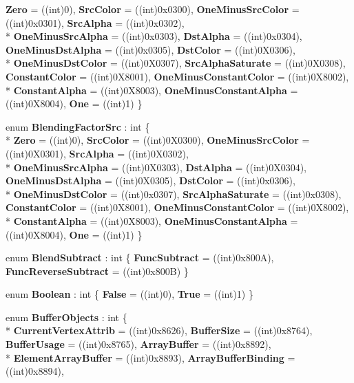\begin{DoxyCompactItemize}
{\bfseries Zero} = ((int)0), 
{\bfseries Src\-Color} = ((int)0x0300), 
{\bfseries One\-Minus\-Src\-Color} = ((int)0x0301), 
{\bfseries Src\-Alpha} = ((int)0x0302), 
\\*
{\bfseries One\-Minus\-Src\-Alpha} = ((int)0x0303), 
{\bfseries Dst\-Alpha} = ((int)0x0304), 
{\bfseries One\-Minus\-Dst\-Alpha} = ((int)0x0305), 
{\bfseries Dst\-Color} = ((int)0\-X0306), 
\\*
{\bfseries One\-Minus\-Dst\-Color} = ((int)0\-X0307), 
{\bfseries Src\-Alpha\-Saturate} = ((int)0\-X0308), 
{\bfseries Constant\-Color} = ((int)0\-X8001), 
{\bfseries One\-Minus\-Constant\-Color} = ((int)0\-X8002), 
\\*
{\bfseries Constant\-Alpha} = ((int)0\-X8003), 
{\bfseries One\-Minus\-Constant\-Alpha} = ((int)0\-X8004), 
{\bfseries One} = ((int)1)
 \}
\item 
enum {\bfseries Blending\-Factor\-Src} \-: int \{ \\*
{\bfseries Zero} = ((int)0), 
{\bfseries Src\-Color} = ((int)0\-X0300), 
{\bfseries One\-Minus\-Src\-Color} = ((int)0\-X0301), 
{\bfseries Src\-Alpha} = ((int)0\-X0302), 
\\*
{\bfseries One\-Minus\-Src\-Alpha} = ((int)0\-X0303), 
{\bfseries Dst\-Alpha} = ((int)0\-X0304), 
{\bfseries One\-Minus\-Dst\-Alpha} = ((int)0\-X0305), 
{\bfseries Dst\-Color} = ((int)0x0306), 
\\*
{\bfseries One\-Minus\-Dst\-Color} = ((int)0x0307), 
{\bfseries Src\-Alpha\-Saturate} = ((int)0x0308), 
{\bfseries Constant\-Color} = ((int)0\-X8001), 
{\bfseries One\-Minus\-Constant\-Color} = ((int)0\-X8002), 
\\*
{\bfseries Constant\-Alpha} = ((int)0\-X8003), 
{\bfseries One\-Minus\-Constant\-Alpha} = ((int)0\-X8004), 
{\bfseries One} = ((int)1)
 \}
\item 
enum {\bfseries Blend\-Subtract} \-: int \{ {\bfseries Func\-Subtract} = ((int)0x800\-A), 
{\bfseries Func\-Reverse\-Subtract} = ((int)0x800\-B)
 \}
\item 
enum {\bfseries Boolean} \-: int \{ {\bfseries False} = ((int)0), 
{\bfseries True} = ((int)1)
 \}
\item 
enum {\bfseries Buffer\-Objects} \-: int \{ \\*
{\bfseries Current\-Vertex\-Attrib} = ((int)0x8626), 
{\bfseries Buffer\-Size} = ((int)0x8764), 
{\bfseries Buffer\-Usage} = ((int)0x8765), 
{\bfseries Array\-Buffer} = ((int)0x8892), 
\\*
{\bfseries Element\-Array\-Buffer} = ((int)0x8893), 
{\bfseries Array\-Buffer\-Binding} = ((int)0x8894), 

\end{DoxyCompactItemize}
